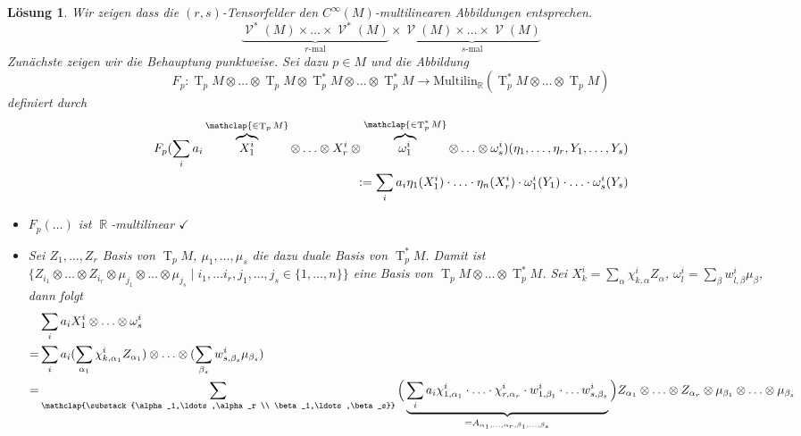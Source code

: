\documentclass[paper=A4, twoside, chapterprefix=true, bibliography=totoc, headsepline]{scrbook}
\DeclareMathOperator{\R}{\mathbb{R}}
\DeclareMathOperator{\calV}{\mathcal{V}}
\DeclareMathOperator{\T}{T}         %
\newcommand{\X}{\times}
\theoremstyle{plain}
\theoremstyle{nonumberplain}
\theoremstyle{empty}
\theoremstyle{break}
\newtheorem{Loes}{L\"osung}
\begin{document}
\begin{Loes}\label{exc:ueb5-a1}
Wir zeigen dass die $(r,s)$-Tensorfelder den $C^\infty(M)$-multilinearen Abbildungen entsprechen.
	\[ \underbrace{\calV^*(M) \X \ldots \X \calV^*(M)}_{r\text{-mal}} \X \underbrace{\calV(M) \X \ldots \X \calV(M)}_{s\text{-mal}} \]
Zun\"achste zeigen wir die Behauptung punktweise. Sei dazu $p \in M$ und die Abbildung
	\[ F_p: \T_pM \otimes \ldots \otimes \T_pM \otimes \T_p^*M \otimes \ldots \otimes \T_p^*M \to \text{Multilin}_{\R}(\T_p^*M \otimes \ldots \otimes \T_pM) \]
definiert durch
\begin{align*}
	F_p(\sum_i a_i \overbrace{X_1^{i}}^{\mathclap{\in \T_pM}} \otimes \ldots \otimes X_r^{i} \otimes \overbrace{\omega_1^{i}}^{\mathclap{\in \T_p^*M}} \otimes \ldots \otimes \omega_s^{i})(\eta_1,\ldots ,\eta_r, Y_1, \ldots ,Y_s)\\
	\qquad := \sum_i a_i \eta_1(X_1^{i}) \cdot \ldots \cdot \eta_n(X_r^{i}) \cdot \omega_1^{i}(Y_1) \cdot \ldots \cdot \omega_s^{i}(Y_s)
\end{align*}
\begin{description}[leftmargin=*]
\item[$\bm{F_p}$ ist wohldefiniert:]
	\begin{itemize}[leftmargin=*]
		\item
			$F_p(\ldots)$ ist $\R$-multilinear $\checkmark$
		\item
			Sei $Z_1,\ldots ,Z_r$ Basis von $\T_pM$, $\mu_1,\ldots ,\mu_s$ die dazu duale Basis von $\T_p^*M$. Damit ist $\{Z_{i_1} \otimes \ldots \otimes Z_{i_r} \otimes \mu_{j_1} \otimes \ldots \otimes \mu_{j_s} \mid i_1, \ldots i_r, j_1, \ldots , j_s \in \{1,\ldots ,n\}\}$ eine Basis von $\T_pM \otimes \ldots \otimes \T_p^*M$. Sei $X_k^{i} = \sum_\alpha \chi_{k, \alpha}^{i} Z_\alpha$, $\omega_l^{i} = \sum_\beta w_{l, \beta}^{i} \mu_\beta$, dann folgt
			\begin{align*}
				& \sum_i a_i X_1^{i} \otimes \ldots \otimes \omega_s^{i}\\
				=& \sum_i a_i (\sum_{\alpha_1} \chi_{k, \alpha_1}^{i} Z_{\alpha_1}) \otimes \ldots  \otimes (\sum_{\beta_s} w_{s, \beta_s}^{i} \mu_{\beta_s})\\
				=& \sum_{\mathclap{\substack{\alpha_1,\ldots ,\alpha_r \\ \beta_1,\ldots ,\beta_s}}} \Big( \underbrace{\sum_i a_i \chi_{1,\alpha_1}^{i} \cdot \ldots \cdot \chi_{r,\alpha_r}^{i} \cdot w_{1, \beta_1}^{i} \cdot \ldots w_{s, \beta_s}^{i} }_{= A_{\alpha_1,\ldots , \alpha_r, \beta_1, \ldots ,\beta_s}} \Big) Z_{\alpha_1} \otimes \ldots \otimes Z_{\alpha_r} \otimes \mu_{\beta_1} \otimes \ldots \otimes \mu_{\beta_s}

\end{align*}
\end{itemize}
\end{description}
\end{Loes}
\end{document}

